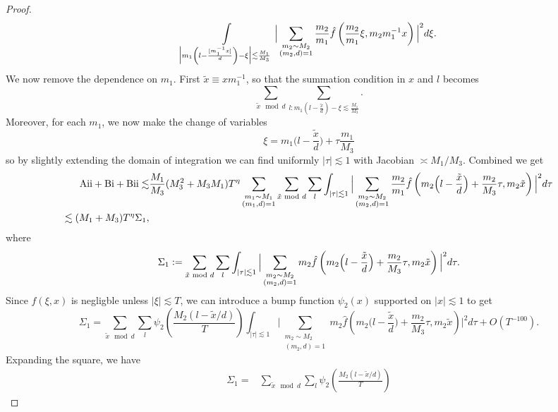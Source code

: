 \begin{proof}
\begin{align*}
            \int\displaylimits_{\Big|m_1\left(l-\frac{[m_1^{-1}x]}{d}\right)- \xi \Big|\lesssim \frac{M_1}{M_3}}
            \Big|
                \sum_{\substack{m_2\sim M_2\\(m_2,d)=1}} \frac{m_2}{m_1}\hat{f}\left(\frac{m_2}{m_1}\xi, m_2m_1^{-1}x\right) 
                \Big|^2 d\xi.\\
    \end{align*}
    We now remove the dependence on $m_1$. First $\tilde{x} \equiv x m_1^{-1}$, so that the summation condition in $x$ and $l$ becomes \[
        \sum_{\tilde{x} \mod d} \sum_{l : m_1\left(l-\frac{\tilde{x}}{d}\right)- \xi \lesssim \frac{M_1}{M_3} }.
    \]
    Moreover, for each $m_1$, we now make the change of variables \[
    \xi = m_1\Big(l-\frac{\tilde{x}}{d}\Big)+\tau\frac{m_1}{M_3}
    \]
    so by slightly extending the domain of integration we can find uniformly $|\tau|\lesssim 1$ with Jacobian $\asymp M_1/M_3$.
    Combined we get
    \begin{align*}
        \rm{Aii}+{Bi}+{Bii} \lesssim &
        \frac{M_1}{M_3}(M_3^2+M_3M_1)T^{\eta}
        \sum_{\substack{m_1\sim M_1\\(m_1,d)=1}}\sum_{\tilde{x} \mod d} \sum_{l  } 
        \int_{|\tau|\lesssim 1}
        \Big|
            \sum_{\substack{m_2\sim M_2\\(m_2,d)=1}} \frac{m_2}{m_1}\hat{f}\left(m_2\Big(l-\frac{\tilde{x}}{d}\Big)+\frac{m_2}{M_3}\tau, m_2\tilde{x}\right) 
            \Big|^2 d\tau\\
            \lesssim (M_1+M_3)T^{\eta} \Sigma_1,
    \end{align*}
    where\[
    \Sigma_1 \defeq \sum_{\tilde{x} \mod d} \sum_{l  } 
    \int_{|\tau|\lesssim 1}
    \Big|
        \sum_{\substack{m_2\sim M_2\\(m_2,d)=1}} {m_2}\hat{f}\left(m_2\Big(l-\frac{\tilde{x}}{d}\Big)+\frac{m_2}{M_3}\tau, m_2\tilde{x}\right) 
        \Big|^2d\tau.
    \]
    Since $\hat{f}(\xi,x)$ is negligble unless $|\xi|\lesssim T$, we can introduce a bump function $\psi_2(x)$ supported on $|x|\lesssim 1$ to get \[
        \Sigma_1 = \sum_{\tilde{x} \mod d} \sum_{l  } \psi_2\left(\frac{M_2(l-\tilde{x}/d)}{T}\right)
        \int_{|\tau|\lesssim 1}
        \Big|
            \sum_{\substack{m_2\sim M_2\\(m_2,d)=1}} {m_2}\hat{f}\left(m_2\Big(l-\frac{\tilde{x}}{d}\Big)+\frac{m_2}{M_3}\tau, m_2\tilde{x}\right) 
            \Big|^2d\tau+O(T^{-100}).
    \]
    Expanding the square, we have \begin{align*}
        \Sigma_1= & \sum_{\tilde{x} \mod d} \sum_{l  }  \psi_2\left(\frac{M_2(l-\tilde{x}/d)}{T}\right)

\end{align*}
\end{proof}
